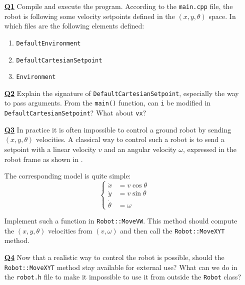 \documentclass{ecnreport}
\begin{document}
\begin{itemize}
\medskip\item[\textbf{\underline{Q1}}]  Compile and execute the program. According to the \texttt{main.cpp} file, the robot is following some velocity setpoints defined in the $(x,y,\theta)$ space. In which files are the following elements defined:
\begin{enumerate}
\item \texttt{DefaultEnvironment}
\item \texttt{DefaultCartesianSetpoint}
\item \texttt{Environment}
\end{enumerate}

\medskip\item[\textbf{\underline{Q2}}] Explain the signature of   \texttt{DefaultCartesianSetpoint}, especially the way to pass arguments. 
From the \texttt{main()} function, can \texttt{i} be modified in \texttt{DefaultCartesianSetpoint}? What about \texttt{vx}?

\medskip\item[\textbf{\underline{Q3}}] In practice it is often impossible to control a ground robot by sending $(x,y,\theta)$ velocities. A classical way to control such a robot is to send a setpoint with a linear velocity $v$ and an angular velocity $\omega$, expressed in the robot frame as shown in .



The corresponding model is quite simple:
\begin{equation}
\left\{\begin{array}{ll}
\dot x &= v\cos \theta \\
\dot y &= v\sin \theta \\
\dot \theta &= \omega
\end{array}\right.
\end{equation}

Implement such a function in \texttt{Robot::MoveVW}. This method should compute the $(x,y,\theta)$ velocities from $(v,\omega)$ and then call the \texttt{Robot::MoveXYT} method. 

\medskip\item[\textbf{\underline{Q4}}] Now that a realistic way to control the robot is possible, should the \texttt{Robot::MoveXYT} method stay available for external use? What can we do in the \texttt{robot.h} file to make it impossible to use it from outside the \texttt{Robot} class?


\end{itemize}
\end{document}
